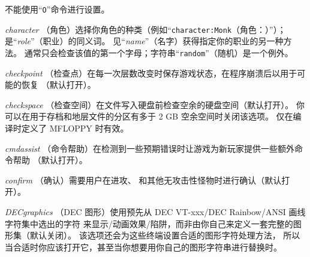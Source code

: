 \documentclass[a4paper, 10pt]{article}
\newcommand{\ib}[1]{\it #1 \hfill}
\begin{document}
不能使用“{\tt O}”命令进行设置。
\item[\ib{character}]
（角色）选择你角色的种类（例如“{\tt character:Monk}（角色：\zhTransMonks）”）；
是“{\it role\/}”（职业）的同义词。
见“{\it name\/}”（名字）获得指定你的职业的另一种方法。
通常只会检查该值的第一个字母；字符串“{\tt random}”（随机）是一个例外。
\item[\ib{checkpoint}]
（检查点）在每一次\zhTransDungeon{}层数改变时保存游戏状态，在程序崩溃后以用于可能的恢复
（默认打开）。
\item[\ib{checkspace}]
（检查空间）在文件写入硬盘前检查空余的硬盘空间（默认打开）。
你可以在用于存档和地层文件的分区有多于 2 GB 空余空间时关闭该选项。
仅在编译时定义了 MFLOPPY 时有效。
\item[\ib{cmdassist}]
（命令帮助）在检测到一些预期错误时让游戏为新玩家提供一些额外命令帮助
（默认打开）。
\item[\ib{confirm}]
（确认）需要用户在进攻\zhTransPets、\zhTransShopkeeper
和其他无攻击性怪物时进行确认（默认打开）。
\item[\ib{DECgraphics}]
（DEC 图形）使用预先从 DEC VT-xxx/DEC Rainbow/ANSI 画线字符集中选出的字符
来显示\zhTransDungeon{}/动画效果/陷阱，而非由你自己来定义一套完整的图形集（默认关闭）。
该选项还会为这些终端设置合适的图形字符处理方法，
所以当合适时你应该打开它，甚至当你想要用你自己的图形字符串进行替换时。
\end{document}
